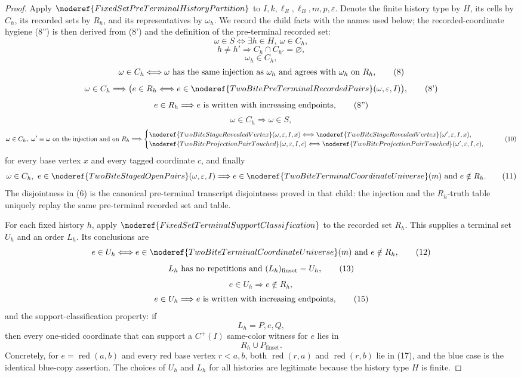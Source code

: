 \begin{proof}
Apply \(\noderef{FixedSetPreTerminalHistoryPartition}\) to
\(I,k,\ell_R,\ell_B,m,p,\varepsilon\).  Denote the finite history type by
\(H\), its cells by \(C_h\), its recorded sets by \(R_h\), and its
representatives by \(\omega_h\).  We record the child facts with the names
used below; the recorded-coordinate hygiene (8'') is then derived from (8')
and the definition of the pre-terminal recorded set:
\[
\omega\in S \Longleftrightarrow \exists h\in H,\ \omega\in C_h, \tag{5}
\]
\[
h\ne h'\Longrightarrow C_h\cap C_{h'}=\varnothing, \tag{6}
\]
\[
\omega_h\in C_h, \tag{7}
\]
\[
\omega\in C_h
\Longleftrightarrow
\omega\hbox{ has the same injection as }\omega_h
\hbox{ and agrees with }\omega_h\hbox{ on }R_h, \tag{8}
\]
\[
\omega\in C_h
\Longrightarrow
\bigl(e\in R_h\Longleftrightarrow
e\in\noderef{TwoBitePreTerminalRecordedPairs}(\omega,\varepsilon,I)\bigr),
\tag{8'}
\]
\[
e\in R_h\Longrightarrow e\hbox{ is written with increasing endpoints},
\tag{8''}
\]
\[
\omega\in C_h\Longrightarrow \omega\in S, \tag{9}
\]
\[
\omega\in C_h,\ \omega'\equiv\omega\hbox{ on the injection and on }R_h
\Longrightarrow
\begin{cases}
\noderef{TwoBiteStageRevealedVertex}(\omega,\varepsilon,I,x)
\Longleftrightarrow
\noderef{TwoBiteStageRevealedVertex}(\omega',\varepsilon,I,x),\\
\noderef{TwoBiteProjectionPairTouched}(\omega,\varepsilon,I,c)
\Longleftrightarrow
\noderef{TwoBiteProjectionPairTouched}(\omega',\varepsilon,I,c),
\end{cases}
\tag{10}
\]
for every base vertex \(x\) and every tagged coordinate \(c\), and finally
\[
\omega\in C_h,\ e\in\noderef{TwoBiteStagedOpenPairs}
(\omega,\varepsilon,I)
\Longrightarrow
e\in\noderef{TwoBiteTerminalCoordinateUniverse}(m)
\hbox{ and }e\notin R_h. \tag{11}
\]
The disjointness in (6) is the canonical pre-terminal transcript
disjointness proved in that child: the injection and the \(R_h\)-truth table
uniquely replay the same pre-terminal recorded set and table.

For each fixed history \(h\), apply
\(\noderef{FixedSetTerminalSupportClassification}\) to the recorded set
\(R_h\).  This supplies a terminal set \(U_h\) and an order \(L_h\).  Its
conclusions are
\[
e\in U_h
\Longleftrightarrow
e\in\noderef{TwoBiteTerminalCoordinateUniverse}(m)\hbox{ and }e\notin R_h,
\tag{12}
\]
\[
L_h\hbox{ has no repetitions and }(L_h)_{\mathrm{finset}}=U_h, \tag{13}
\]
\[
e\in U_h\Longrightarrow e\notin R_h, \tag{14}
\]
\[
e\in U_h\Longrightarrow e\hbox{ is written with increasing endpoints},
\tag{15}
\]
and the support-classification property: if
\[
L_h=P,e,Q,
\tag{16}
\]
then every one-sided coordinate that can support a
\(C^+(I)\) same-color witness for \(e\) lies in
\[
R_h\cup P_{\mathrm{finset}}. \tag{17}
\]
Concretely, for \(e=\operatorname{red}(a,b)\) and every red base vertex
\(r<a,b\), both \(\operatorname{red}(r,a)\) and
\(\operatorname{red}(r,b)\) lie in (17), and the blue case is the identical
blue-copy assertion.  The choices of \(U_h\) and \(L_h\) for all histories
are legitimate because the history type \(H\) is finite.


\end{proof}
